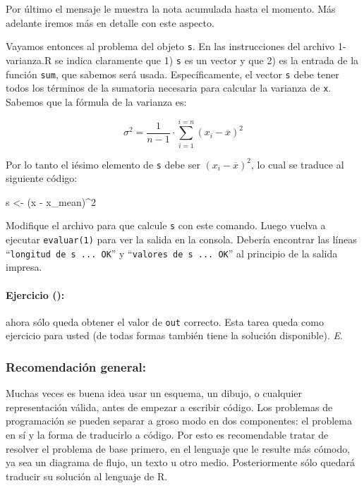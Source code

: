 \documentclass[]{article}
\newenvironment{Shaded}{}{}
\newcommand{\DecValTok}[1]{\textcolor[rgb]{0.25,0.63,0.44}{{#1}}}
\newcommand{\NormalTok}[1]{{#1}}
\begin{document}
Por último el mensaje le muestra la nota acumulada hasta el momento. Más
adelante iremos más en detalle con este aspecto.

Vayamos entonces al problema del objeto \texttt{s}. En las instrucciones
del archivo 1-varianza.R se indica claramente que 1) \texttt{s} es un
vector y que 2) es la entrada de la función \texttt{sum}, que sabemos
será usada. Específicamente, el vector \texttt{s} debe tener todos los
términos de la sumatoria necesaria para calcular la varianza de
\texttt{x}. Sabemos que la fórmula de la varianza es:

\[
  \sigma ^ 2 = \frac{1}{n - 1} \cdot \sum_{i=1}^{i=n} (x_i - \overline{x}) ^ 2 
\]

Por lo tanto el iésimo elemento de \texttt{s} debe ser
$(x_i - \overline{x}) ^ 2$, lo cual se traduce al siguiente código:

\begin{Shaded}
\begin{Highlighting}[]
\NormalTok{s <- (x - x_mean)^}\DecValTok{2}
\end{Highlighting}
\end{Shaded}
Modifique el archivo para que calcule \texttt{s} con este comando. Luego
vuelva a ejecutar \texttt{evaluar(1)} para ver la salida en la consola.
Debería encontrar las líneas ``\texttt{longitud de s ... OK}'' y
``\texttt{valores de s ... OK}'' al principio de la salida impresa.

\paragraph{Ejercicio ():}

ahora sólo queda obtener el valor de \texttt{out} correcto. Esta tarea
queda como ejercicio para usted (de todas formas también tiene la
solución disponible). \emph{E}.

\subsubsection{Recomendación general:}

Muchas veces es buena idea usar un esquema, un dibujo, o cualquier
representación válida, antes de empezar a escribir código. Los problemas
de programación se pueden separar a groso modo en dos componentes: el
problema en sí y la forma de traducirlo a código. Por esto es
recomendable tratar de resolver el problema de base primero, en el
lenguaje que le resulte más cómodo, ya sea un diagrama de flujo, un
texto u otro medio. Posteriormente sólo quedará traducir su solución al
lenguaje de R.
\end{document}
